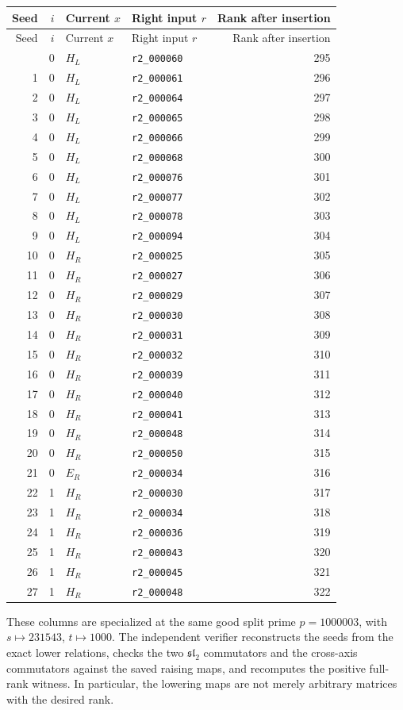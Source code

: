 \begin{longtable}{@{}rrllr@{}}
\toprule Seed&$i$&Current $x$&Right input $r$&Rank after insertion\\\midrule\endfirsthead
\toprule Seed&$i$&Current $x$&Right input $r$&Rank after insertion\\\midrule\endhead
\bottomrule\endfoot
0 & 0 & $H_L$ & \texttt{r2\_000060} & 295\\
1 & 0 & $H_L$ & \texttt{r2\_000061} & 296\\
2 & 0 & $H_L$ & \texttt{r2\_000064} & 297\\
3 & 0 & $H_L$ & \texttt{r2\_000065} & 298\\
4 & 0 & $H_L$ & \texttt{r2\_000066} & 299\\
5 & 0 & $H_L$ & \texttt{r2\_000068} & 300\\
6 & 0 & $H_L$ & \texttt{r2\_000076} & 301\\
7 & 0 & $H_L$ & \texttt{r2\_000077} & 302\\
8 & 0 & $H_L$ & \texttt{r2\_000078} & 303\\
9 & 0 & $H_L$ & \texttt{r2\_000094} & 304\\
10 & 0 & $H_R$ & \texttt{r2\_000025} & 305\\
11 & 0 & $H_R$ & \texttt{r2\_000027} & 306\\
12 & 0 & $H_R$ & \texttt{r2\_000029} & 307\\
13 & 0 & $H_R$ & \texttt{r2\_000030} & 308\\
14 & 0 & $H_R$ & \texttt{r2\_000031} & 309\\
15 & 0 & $H_R$ & \texttt{r2\_000032} & 310\\
16 & 0 & $H_R$ & \texttt{r2\_000039} & 311\\
17 & 0 & $H_R$ & \texttt{r2\_000040} & 312\\
18 & 0 & $H_R$ & \texttt{r2\_000041} & 313\\
19 & 0 & $H_R$ & \texttt{r2\_000048} & 314\\
20 & 0 & $H_R$ & \texttt{r2\_000050} & 315\\
21 & 0 & $E_R$ & \texttt{r2\_000034} & 316\\
22 & 1 & $H_R$ & \texttt{r2\_000030} & 317\\
23 & 1 & $H_R$ & \texttt{r2\_000034} & 318\\
24 & 1 & $H_R$ & \texttt{r2\_000036} & 319\\
25 & 1 & $H_R$ & \texttt{r2\_000043} & 320\\
26 & 1 & $H_R$ & \texttt{r2\_000045} & 321\\
27 & 1 & $H_R$ & \texttt{r2\_000048} & 322\\
\end{longtable}
These columns are specialized at the same good split prime
$p=1000003$, with $s\mapsto231543$, $t\mapsto1000$.
The independent verifier reconstructs the seeds from the exact lower
relations, checks the two $\mathfrak{sl}_2$ commutators and the
cross-axis commutators against the saved raising maps, and recomputes
the positive full-rank witness. In particular, the lowering maps are
not merely arbitrary matrices with the desired rank.

